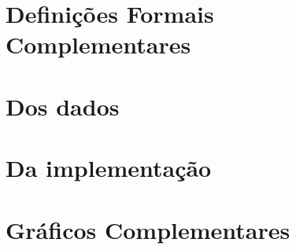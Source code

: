 \documentclass[
12pt,				%
openright,			%
oneside,			%
a4paper,			%
english, %
french, %
spanish, %
brazil, %
table,
xcdraw
]{abntex2}
\begin{document}
    
\begin{apendicesenv}
  \partapendices

  \chapter{Definições Formais Complementares}
  
\chapter{Dos dados}



\chapter{Da implementação}




\chapter{Gráficos Complementares}



\end{apendicesenv}



\postextual
	

	
 \printindex
	
\end{document}
